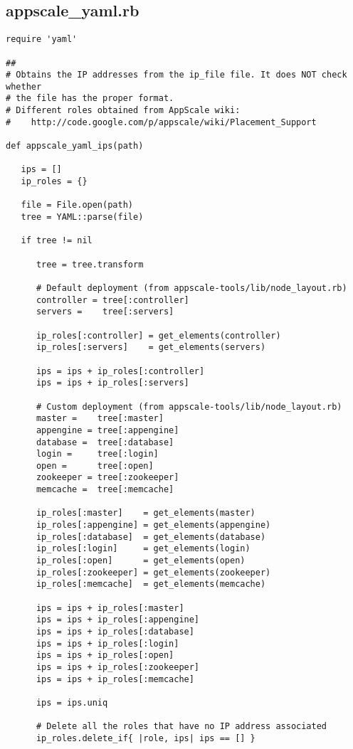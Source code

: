 \subsection{appscale\_yaml.rb}


\begin{lstlisting}
require 'yaml'

##
# Obtains the IP addresses from the ip_file file. It does NOT check whether
# the file has the proper format.
# Different roles obtained from AppScale wiki:
#    http://code.google.com/p/appscale/wiki/Placement_Support

def appscale_yaml_ips(path)

   ips = []
   ip_roles = {}
   
   file = File.open(path)
   tree = YAML::parse(file)
   
   if tree != nil
   
      tree = tree.transform
      
      # Default deployment (from appscale-tools/lib/node_layout.rb)
      controller = tree[:controller]
      servers =    tree[:servers]
      
      ip_roles[:controller] = get_elements(controller)
      ip_roles[:servers]    = get_elements(servers)
      
      ips = ips + ip_roles[:controller]
      ips = ips + ip_roles[:servers]
      
      # Custom deployment (from appscale-tools/lib/node_layout.rb)
      master =    tree[:master]
      appengine = tree[:appengine]
      database =  tree[:database]
      login =     tree[:login]
      open =      tree[:open]
      zookeeper = tree[:zookeeper]
      memcache =  tree[:memcache]
      
      ip_roles[:master]    = get_elements(master)
      ip_roles[:appengine] = get_elements(appengine)
      ip_roles[:database]  = get_elements(database)
      ip_roles[:login]     = get_elements(login)
      ip_roles[:open]      = get_elements(open)
      ip_roles[:zookeeper] = get_elements(zookeeper)
      ip_roles[:memcache]  = get_elements(memcache)
      
      ips = ips + ip_roles[:master]
      ips = ips + ip_roles[:appengine]
      ips = ips + ip_roles[:database]
      ips = ips + ip_roles[:login]
      ips = ips + ip_roles[:open]
      ips = ips + ip_roles[:zookeeper]
      ips = ips + ip_roles[:memcache]
      
      ips = ips.uniq
      
      # Delete all the roles that have no IP address associated
      ip_roles.delete_if{ |role, ips| ips == [] }
      

\end{lstlisting}
